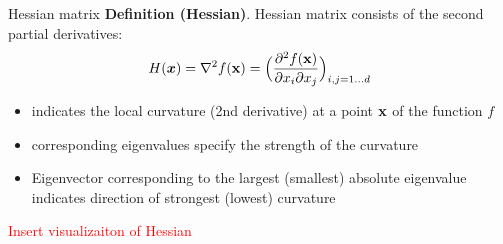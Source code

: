 \begin{vbframe}{Hessian matrix}
  \textbf{Definition (Hessian)}. Hessian matrix consists of the second partial derivatives:
  \[ H(\boldsymbol{x}) =\nabla^2 f(\mathbf{x}) =
  \Bigl(\frac{\partial^2 f(\mathbf{x})}{\partial x_i \partial x_j}\Bigr)_{i,j=1\ldots d}\]
  \begin{itemize}
  \item indicates the local curvature (2nd derivative) at a point $\mathbf{x}$ of the function $f$
  \item corresponding eigenvalues specify the strength of the curvature
  \item Eigenvector corresponding to the largest (smallest) absolute eigenvalue indicates  direction of strongest (lowest) curvature
  \end{itemize}


  \framebreak 

    \textcolor{red}{Insert visualizaiton of Hessian}
  \end{vbframe}
  \framebreak 

